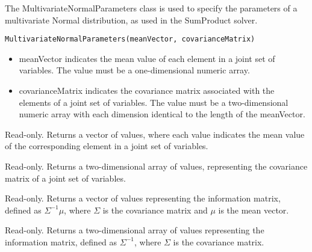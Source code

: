 The MultivariateNormalParameters class is used to specify the parameters of a multivariate Normal distribution, as used in the SumProduct solver.


\begin{lstlisting}
MultivariateNormalParameters(meanVector, covarianceMatrix)
\end{lstlisting}

\begin{itemize}
\item meanVector indicates the mean value of each element in a joint set of variables.  The value must be a one-dimensional numeric array.
\item covarianceMatrix indicates the covariance matrix associated with the elements of a joint set of variables.  The value must be a two-dimensional numeric array with each dimension identical to the length of the meanVector.
\end{itemize}




Read-only.  Returns a vector of values, where each value indicates the mean value of the corresponding element in a joint set of variables.


Read-only.  Returns a two-dimensional array of values, representing the covariance matrix of a joint set of variables.


Read-only.  Returns a vector of values representing the information matrix, defined as $\Sigma^{-1}\mu$, where $\Sigma$ is the covariance matrix and $\mu$ is the mean vector.


Read-only.  Returns a two-dimensional array of values representing the information matrix, defined as $\Sigma^{-1}$, where $\Sigma$ is the covariance matrix.





